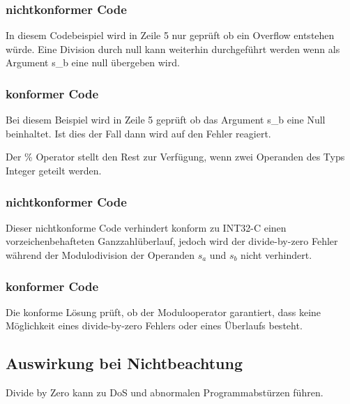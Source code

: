 \documentclass[12pt]{article}
\begin{document}
\subsubsection{nichtkonformer Code}


In diesem Codebeispiel wird in Zeile 5 nur geprüft ob ein Overflow entstehen würde. Eine Division durch null kann weiterhin durchgeführt werden wenn als Argument s\_b eine null übergeben wird.
\newpage
\subsubsection{konformer Code}


Bei diesem Beispiel wird in Zeile 5 geprüft ob das Argument s\_b eine Null beinhaltet. Ist dies der Fall dann wird auf den Fehler reagiert.

Der \% Operator stellt den Rest zur Verf\"ugung, wenn zwei Operanden des Typs Integer geteilt werden.
\subsubsection{nichtkonformer Code}
Dieser nichtkonforme Code verhindert konform zu INT32-C einen vorzeichenbehafteten Ganzzahl\"uberlauf, jedoch wird der divide-by-zero Fehler w\"ahrend der Modulodivision der Operanden \(s_a\) und \(s_b\) nicht verhindert.



\subsubsection{konformer Code}
Die konforme L\"osung pr\"uft, ob der Modulooperator garantiert, dass keine M\"oglichkeit eines divide-by-zero Fehlers oder eines \"Uberlaufs besteht.

\subsection{Auswirkung bei Nichtbeachtung}
Divide by Zero kann zu DoS und abnormalen Programmabstürzen  führen.
\end{document}
